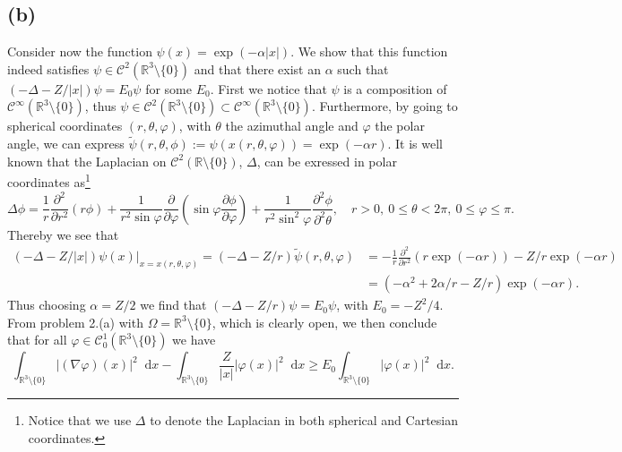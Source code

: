 \documentclass[a4paper,11pt]{article}
\newcommand{\abs}[1]{\left\lvert #1 \right\rvert}
\newcommand*\diff{\mathop{}\!\mathrm{d}}
\newcommand{\R}{\mathbb{R}}
\numberwithin{equation}{section}
\begin{document}
\subsection*{(b)} Consider now the function $ \psi(x)=\exp(-\alpha\abs{x}) $. We show that this function indeed satisfies $ \psi\in \mathcal{C}^2(\R^3\setminus\{0\}) $ and that there exist an $ \alpha $ such that $ (-\Delta-Z/\abs{x})\psi=E_0\psi $ for some $ E_0 $. First we notice that $ \psi $ is a composition of $ \mathcal{C}^\infty(\R^3\setminus\{0\}) $, thus $ \psi\in\mathcal{C}^2(\R^3\setminus\{0\})\subset\mathcal{C}^\infty(\R^3\setminus\{0\}) $. Furthermore, by going to spherical coordinates $ (r,\theta,\varphi) $, with $ \theta $ the azimuthal angle and $ \varphi $ the polar angle, we can express $ \tilde{\psi}(r,\theta,\phi):=\psi(x(r,\theta,\varphi))=\exp(-\alpha r) $. It is well known that the Laplacian on $ \mathcal{C}^2(\R\setminus\{0\}) $, $ \Delta $, can be exressed in polar coordinates as\footnote{Notice that we use $ \Delta $ to denote the Laplacian in both spherical and Cartesian coordinates.} \begin{equation}
\Delta\phi=\frac{1}{r}\frac{\partial^2}{\partial r^2}(r\phi)+\frac{1}{r^2\sin\varphi}\frac{\partial}{\partial\varphi}(\sin\varphi\frac{\partial\phi}{\partial\varphi})+\frac{1}{r^2\sin^2\varphi}\frac{\partial^2\phi}{\partial^2\theta}, \quad r>0,\ 0\leq\theta<2\pi,\ 0\leq\varphi\leq\pi.
\end{equation}
Thereby we see that \begin{equation*}
\begin{aligned}
(-\Delta-Z/\abs{x})\psi(x)\rvert_{x=x(r,\theta,\varphi)}=(-\Delta-Z/r)\tilde{\psi}(r,\theta,\varphi)&=-\frac{1}{r}\frac{\partial^2}{\partial r^2}(r \exp(-\alpha r))-Z/r\exp(-\alpha r)\\
&=(-\alpha^2+2\alpha/r-Z/r)\exp(-\alpha r).
\end{aligned}
\end{equation*} 
Thus choosing $ \alpha=Z/2 $ we find that $ (-\Delta-Z/r)\psi=E_0\psi $, with  $ E_0=-Z^2/4 $. From problem 2.(a) with $ \Omega=\R^3\setminus\{0\} $, which is clearly open, we then conclude that for all $ \varphi\in\mathcal{C}_0^1(\R^3\setminus\{0\}) $ we have 
\begin{equation}
\int_{\R^3\setminus\{0\}}\lvert(\nabla\varphi)(x) \rvert^2\diff x-\int_{\R^3\setminus\{0\}}\frac{Z}{\abs{x}}\lvert\varphi(x)\rvert^2 \diff x\geq E_0\int_{\R^3\setminus\{0\}}\lvert\varphi(x)\rvert^2 \diff x.
\end{equation}
\end{document}
